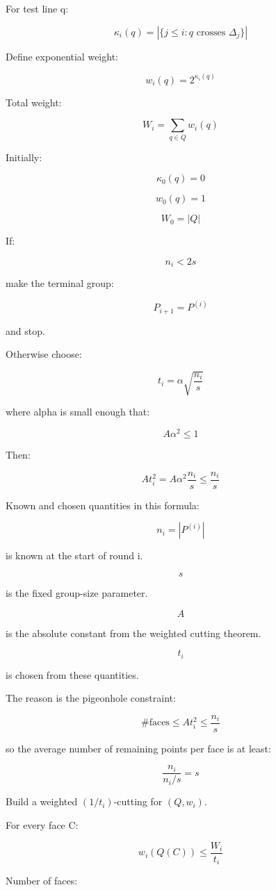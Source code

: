 \documentclass[
  11pt,
]{article}
\begin{document}
For test line q:

\[
\kappa_i(q)=|\lbrace j\le i:q\text{ crosses }\Delta_j \rbrace|
\]

Define exponential weight:

\[
w_i(q)=2^{\kappa_i(q)}
\]

Total weight:

\[
W_i=\sum_{q\in Q}w_i(q)
\]

Initially:

\[
\kappa_0(q)=0
\]

\[
w_0(q)=1
\]

\[
W_0=|Q|
\]

If:

\[
n_i<2s
\]

make the terminal group:

\[
P_{i+1}=P^{(i)}
\]

and stop.

Otherwise choose:

\[
t_i=\alpha\sqrt{\frac{n_i}{s}}
\]

where alpha is small enough that:

\[
A\alpha^2\le 1
\]

Then:

\[
At_i^2 = A\alpha^2\frac{n_i}{s} \le \frac{n_i}{s}
\]

Known and chosen quantities in this formula:

\[
n_i=|P^{(i)}|
\]

is known at the start of round i.

\[
s
\]

is the fixed group-size parameter.

\[
A
\]

is the absolute constant from the weighted cutting theorem.

\[
t_i
\]

is chosen from these quantities.

The reason is the pigeonhole constraint:

\[
\#\text{faces}\le At_i^2\le \frac{n_i}{s}
\]

so the average number of remaining points per face is at least:

\[
\frac{n_i}{n_i/s}=s
\]

Build a weighted \((1/t_i)\)-cutting for \((Q,w_i)\).

For every face C:

\[
w_i(Q(C))\le \frac{W_i}{t_i}
\]

Number of faces:
\end{document}
